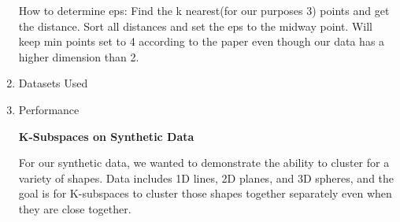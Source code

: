 \documentclass[12pt]{article}
\begin{document}
\begin{enumerate}
How to determine eps:
Find the k nearest(for our purposes 3) points and get the distance. Sort all distances and set the eps to the midway point. Will keep min points set to 4 according to the paper even though our data has a higher dimension than 2.

\item Datasets Used

\item Performance

\textbf{K-Subspaces on Synthetic Data}

 For our synthetic data, we wanted to demonstrate the ability to cluster for a variety of shapes. Data includes 1D lines, 2D planes, and 3D spheres, and the goal is for K-subspaces to cluster those shapes together separately even when they are close together. 



\end{enumerate}
\end{document}
